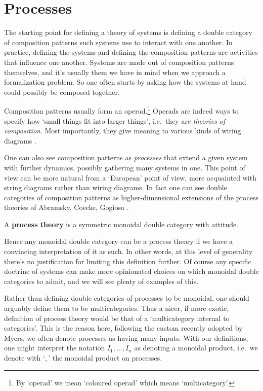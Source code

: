 \section{Processes}
The starting point for defining a theory of systems is defining a double category of composition patterns such systems use to interact with one another.
In practice, defining the systems and defining the composition patterns are activities that influence one another. Systems are made out of composition patterns themselves, and it's usually them we have in mind when we approach a formalization problem. So one often starts by asking how the systems at hand could possibly be composed together.

Composition patterns usually form an operad.\footnote{By `operad' we mean `coloured operad' which means `multicategory'.}
Operads are indeed ways to specify how `small things fit into larger things', i.e.~they are \emph{theories of composition}. Most importantly, they give meaning to various kinds of wiring diagrams \cite{spivak2013operad,vagner2014algebras, libkind2021operadic}.

One can also see composition patterns as \emph{processes} that extend a given system with further dynamics, possibly gathering many systems in one. This point of view can be more natural from a `European' point of view, more acquainted with string diagrams rather than wiring diagrams. In fact one can see double categories of composition patterns as higher-dimensional extensions of the process theories of Abramsky, Coecke, Gogioso \cite{abramsky2004categorical, coecke2018picturing}.

\begin{definition}
	A \textbf{process theory} is a symmetric monoidal double category with attitude.
\end{definition}

Hence any monoidal double category can be a process theory if we have a convincing interpretation of it as such. In other words, at this level of generality there's no justification for limiting this definition further. Of course any specific doctrine of systems can make more opinionated choices on which monoidal double categories to admit, and we will see plenty of examples of this.

\begin{remark}
	Rather than defining double categories of processes to be monoidal, one should arguably define them to be multicategories. Thus a nicer, if more exotic, definition of process theory would be that of a `multicategory internal to categories'.%
	This is the reason here, following the custom recently adopted by Myers, we often denote processes as having many inputs. With our definitions, one might interpret the notation $I_1, \ldots, I_n$ as denoting a monoidal product, i.e.~we denote with `$, $' the monoidal product on processes.
\end{remark}

